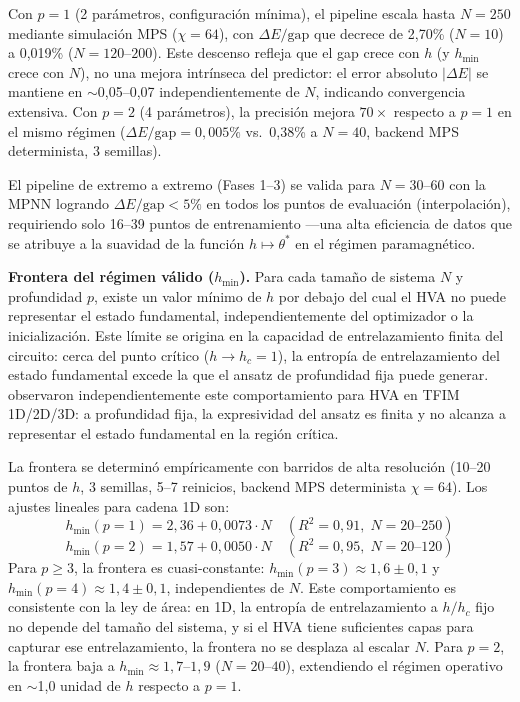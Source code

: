 \documentclass[11pt,a4paper,spanish]{book}
\begin{document}
Con $p = 1$ (2 parámetros, configuración mínima), el pipeline escala hasta $N = 250$ mediante simulación MPS ($\chi = 64$), con $\Delta E/\text{gap}$ que decrece de 2,70\% ($N = 10$) a 0,019\% ($N = 120$--$200$). Este descenso refleja que el gap crece con $h$ (y $h_{\min}$ crece con $N$), no una mejora intrínseca del predictor: el error absoluto $|\Delta E|$ se mantiene en $\sim$0,05--0,07 independientemente de $N$, indicando convergencia extensiva. Con $p = 2$ (4 parámetros), la precisión mejora $70\times$ respecto a $p = 1$ en el mismo régimen ($\Delta E/\text{gap} = 0,005\%$ vs.\ 0,38\% a $N = 40$, backend MPS determinista, 3 semillas).

El pipeline de extremo a extremo (Fases 1--3) se valida para $N = 30$--$60$ con la MPNN logrando $\Delta E/\text{gap} < 5\%$ en todos los puntos de evaluación (interpolación), requiriendo solo 16--39 puntos de entrenamiento ---una alta eficiencia de datos que se atribuye a la suavidad de la función $h \mapsto \theta^*$ en el régimen paramagnético.

\textbf{Frontera del régimen válido ($h_{\min}$).} Para cada tamaño de sistema $N$ y profundidad $p$, existe un valor mínimo de $h$ por debajo del cual el HVA no puede representar el estado fundamental, independientemente del optimizador o la inicialización. Este límite se origina en la capacidad de entrelazamiento finita del circuito: cerca del punto crítico ($h \to h_c = 1$), la entropía de entrelazamiento del estado fundamental excede la que el ansatz de profundidad fija puede generar. \citet{tripathi2026} observaron independientemente este comportamiento para HVA en TFIM 1D/2D/3D: a profundidad fija, la expresividad del ansatz es finita y no alcanza a representar el estado fundamental en la región crítica.

La frontera se determinó empíricamente con barridos de alta resolución (10--20 puntos de $h$, 3 semillas, 5--7 reinicios, backend MPS determinista $\chi = 64$). Los ajustes lineales para cadena 1D son:
\begin{equation}
h_{\min}(p{=}1) = 2,36 + 0,0073 \cdot N \quad (R^2 = 0,91, \; N = 20\text{--}250)
\label{eq:frontier_p1}
\end{equation}
\begin{equation}
h_{\min}(p{=}2) = 1,57 + 0,0050 \cdot N \quad (R^2 = 0,95, \; N = 20\text{--}120)
\label{eq:frontier_p2}
\end{equation}
Para $p \geq 3$, la frontera es cuasi-constante: $h_{\min}(p{=}3) \approx 1,6 \pm 0,1$ y $h_{\min}(p{=}4) \approx 1,4 \pm 0,1$, independientes de $N$. Este comportamiento es consistente con la ley de área: en 1D, la entropía de entrelazamiento a $h/h_c$ fijo no depende del tamaño del sistema, y si el HVA tiene suficientes capas para capturar ese entrelazamiento, la frontera no se desplaza al escalar $N$. Para $p = 2$, la frontera baja a $h_{\min} \approx 1,7$--$1,9$ ($N = 20$--$40$), extendiendo el régimen operativo en $\sim$1,0 unidad de $h$ respecto a $p = 1$.
\end{document}
